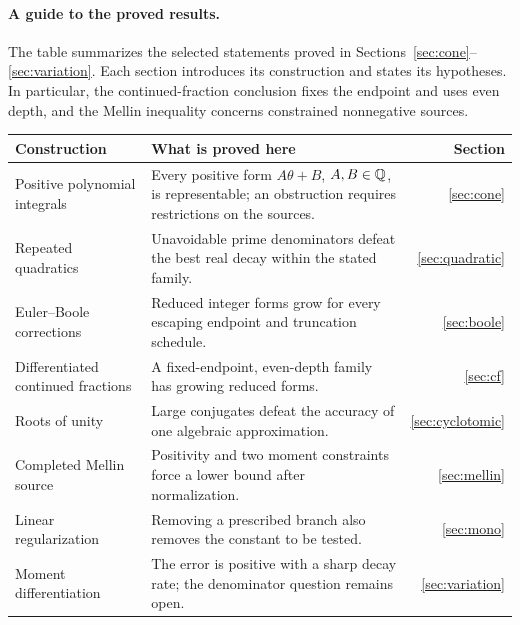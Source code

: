 \paragraph{A guide to the proved results.}
The table summarizes the selected statements proved in
Sections~\ref{sec:cone}--\ref{sec:variation}. Each section introduces
its construction and states its hypotheses. In particular, the
continued-fraction conclusion fixes the endpoint and uses even depth,
and the Mellin inequality concerns constrained nonnegative sources.
\begin{center}
\begin{tabular}{@{}>{\raggedright\arraybackslash}p{.25\linewidth}
                  >{\raggedright\arraybackslash}p{.59\linewidth}r@{}}
\toprule
Construction & What is proved here & Section\\
\midrule
Positive polynomial integrals
 & Every positive form $A\theta+B$, $A,B\in\mathbb Q$, is representable;
   an obstruction requires restrictions on the sources. & \ref{sec:cone}\\[3pt]
Repeated quadratics
 & Unavoidable prime denominators defeat the best real decay
   within the stated family. & \ref{sec:quadratic}\\[3pt]
Euler--Boole corrections
 & Reduced integer forms grow for every escaping endpoint and
   truncation schedule. & \ref{sec:boole}\\[3pt]
Differentiated continued fractions
 & A fixed-endpoint, even-depth family has growing reduced forms.
   & \ref{sec:cf}\\[3pt]
Roots of unity
 & Large conjugates defeat the accuracy of one algebraic approximation.
   & \ref{sec:cyclotomic}\\[3pt]
Completed Mellin source
 & Positivity and two moment constraints force a lower bound
   after normalization. & \ref{sec:mellin}\\[3pt]
Linear regularization
 & Removing a prescribed branch also removes the constant to
   be tested. & \ref{sec:mono}\\[3pt]
Moment differentiation
 & The error is positive with a sharp decay rate;
   the denominator question remains open. & \ref{sec:variation}\\
\bottomrule
\end{tabular}
\end{center}

